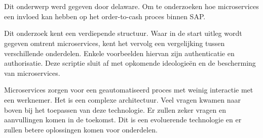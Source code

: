 
%
%

%



\chapter*{}


Dit onderwerp werd gegeven door delaware. Om te onderzoeken hoe microservices een invloed kan hebben op het order-to-cash proces binnen SAP. 

Dit onderzoek kent een verdiepende structuur. Waar in de start uitleg wordt gegeven omtrent microservices, kent het vervolg een vergelijking tussen verschillende onderdelen. Enkele voorbeelden hiervan zijn authenticatie en authorisatie. Deze scriptie sluit af met opkomende ideologieën en de bescherming van microservices.


Microservices zorgen voor een geautomatiseerd proces met weinig interactie met een werknemer. Het is een complexe architectuur. 
Veel vragen kwamen naar boven bij het toepassen van deze technologie. 
Er zullen zeker vragen en aanvullingen komen in de toekomst. Dit is een evoluerende technologie en er zullen betere oplossingen komen voor onderdelen.